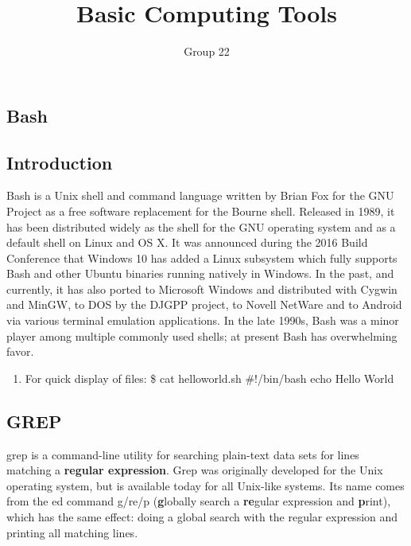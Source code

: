 \documentclass{beamer}
\author{ Group 22 }
\institute{IIT Kanpur}
\title{Basic Computing Tools}
\begin{document}
	
\frame{\titlepage}

\begin{frame}
	
	\section{Bash}
        \subsection{Introduction}
Bash is a Unix shell and command language written by Brian Fox for the GNU Project as a free software replacement for the Bourne shell. Released in 1989, it has been distributed widely as the shell for the GNU operating system and as a default shell on Linux and OS X. It was announced during the 2016 Build Conference that Windows 10 has added a Linux subsystem which fully supports Bash and other Ubuntu binaries running natively in Windows. In the past, and currently, it has also ported to Microsoft Windows and distributed with Cygwin and MinGW, to DOS by the DJGPP project, to Novell NetWare and to Android via various terminal emulation applications. In the late 1990s, Bash was a minor player among multiple commonly used shells; at present Bash has overwhelming favor.
\end{frame}
\begin{frame}
\begin{enumerate}
    \item
        For quick display of files:
            \$ cat helloworld.sh
            #!/bin/bash
            echo Hello World
\end{enumerate}
\end{frame}
\begin{frame}
    \subsection{GREP}
    grep is a command-line utility for searching plain-text data sets for lines matching a \textbf{regular expression}. Grep was originally developed for the Unix operating system, but is available today for all Unix-like systems. Its name comes from the ed command g/re/p (\textbf{g}lobally search a \textbf{re}gular expression and \textbf{p}rint), which has the same effect: doing a global search with the regular expression and printing all matching lines.
\end{frame}
\end{document}
